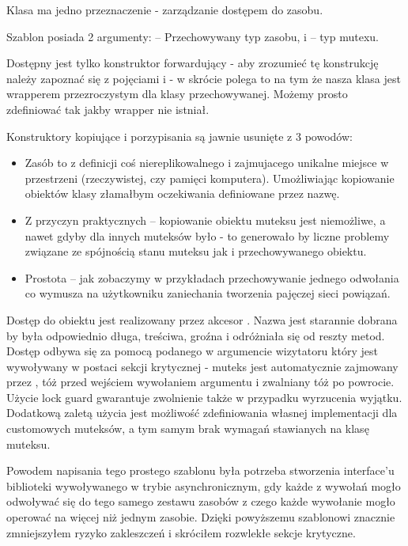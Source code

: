 
Klasa ma jedno przeznaczenie - zarządzanie dostępem do zasobu.

Szablon posiada 2 argumenty:  -- Przechowywany typ zasobu, i  -- typ mutexu.

Dostępny jest tylko konstruktor forwardujący - aby zrozumieć tę konstrukcję należy zapoznać się z pojęciami  i  - w skrócie polega to na tym że nasza klasa  jest wrapperem przezroczystym dla klasy przechowywanej. Możemy prosto zdefiniować  tak jakby wrapper  nie istniał.

Konstruktory kopiujące i porzypisania są jawnie usunięte z 3 powodów:
\begin{itemize}
\item Zasób to z definicji coś niereplikowalnego i zajmujacego unikalne miejsce w przestrzeni (rzeczywistej, czy pamięci komputera). Umożliwiając kopiowanie obiektów klasy  złamałbym oczekiwania definiowane przez nazwę.
\item Z przyczyn praktycznych -- kopiowanie obiektu muteksu jest niemożliwe, a nawet gdyby dla innych muteksów było - to generowało by liczne problemy związane ze spójnością stanu muteksu jak i przechowywanego obiektu.
\item Prostota -- jak zobaczymy w przykładach przechowywanie jednego odwołania co wymusza na użytkowniku zaniechania tworzenia pajęczej sieci powiązań.
\end{itemize}

Dostęp do obiektu jest realizowany przez akcesor . Nazwa jest starannie dobrana by była odpowiednio długa, treściwa, groźna i odróżniała się od reszty metod. Dostęp odbywa się za pomocą podanego w argumencie wizytatoru który jest wywoływany w postaci sekcji krytycznej - muteks jest automatycznie zajmowany przez , tóż przed wejściem wywołaniem argumentu i zwalniany tóż po powrocie. Użycie lock guard gwarantuje zwolnienie także w przypadku wyrzucenia wyjątku. Dodatkową zaletą użycia  jest możliwość zdefiniowania własnej implementacji dla customowych muteksów, a tym samym brak wymagań stawianych na klasę muteksu.

Powodem napisania tego prostego szablonu była potrzeba stworzenia interface'u biblioteki wywoływanego w trybie asynchronicznym, gdy każde z wywołań mogło odwoływać się do tego samego zestawu zasobów z czego każde wywołanie mogło operować na więcej niż jednym zasobie. Dzięki powyższemu szablonowi znacznie zmniejszyłem ryzyko zakleszczeń i skróciłem rozwlekłe sekcje krytyczne.
